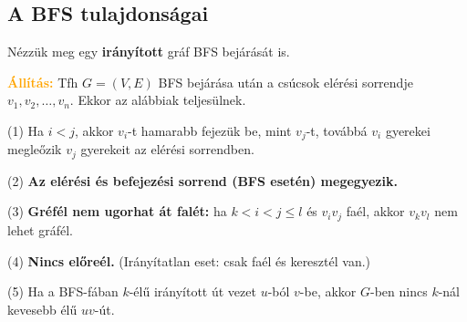 \documentclass[../szamtud.tex]{subfiles}
\begin{document}
		\subsection{A BFS tulajdonságai}
			
			Nézzük meg egy \textbf{irányított} gráf BFS bejárását is.

			\textbf{\textcolor{Orange}{Állítás:}} Tfh $G=(V,E)$ BFS bejárása után a csúcsok elérési sorrendje $v_1,v_2,\dots,v_n$. Ekkor az alábbiak teljesülnek.

			(1) Ha $i < j$, akkor $v_i$-t hamarabb fejezük be, mint $v_j$-t, továbbá $v_i$ gyerekei megleőzik $v_j$ gyerekeit az elérési sorrendben.


			(2) \textbf{Az elérési és befejezési sorrend (BFS esetén) megegyezik.}


			(3) \textbf{Gréfél nem ugorhat át falét:} ha $k < i < j \leq l$ és  $v_i v_j$ faél, akkor $v_k v_l$ nem lehet gráfél.


			(4) \textbf{Nincs előreél.} (Irányítatlan eset: csak faél és keresztél van.) 


			(5) Ha a BFS-fában $k$-élű irányított út vezet $u$-ból $v$-be, akkor $G$-ben nincs $k$-nál kevesebb élű $uv$-út.

\end{document}
